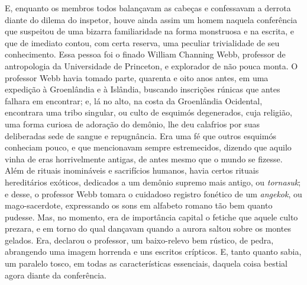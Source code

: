 E, enquanto os membros todos balançavam as cabeças e confessavam a
derrota diante do dilema do inspetor, houve ainda assim um homem naquela
conferência que suspeitou de uma bizarra familiaridade na forma
monstruosa e na escrita, e que de imediato contou, com certa reserva,
uma peculiar trivialidade de seu conhecimento. Essa pessoa foi o finado
William Channing Webb, professor de antropologia da Universidade de
Princeton, e explorador de não pouca monta. O professor Webb havia
tomado parte, quarenta e oito anos antes, em uma expedição à Groenlândia
e à Islândia, buscando inscrições rúnicas que antes falhara em
encontrar; e, lá no alto, na costa da Groenlândia Ocidental, encontrara
uma tribo singular, ou culto de esquimós degenerados, cuja religião, uma
forma curiosa de adoração do demônio, lhe deu calafrios por suas
deliberadas sede de sangue e repugnância. Era uma fé que outros esquimós
conheciam pouco, e que mencionavam sempre estremecidos, dizendo que
aquilo vinha de eras horrivelmente antigas, de antes mesmo que o mundo
se fizesse. Além de rituais inomináveis e sacrifícios humanos, havia
certos rituais hereditários exóticos, dedicados a um demônio supremo
mais antigo, ou \emph{tornasuk}; e desse, o professor Webb
tomara o cuidadoso registro fonético de um \emph{angekok}, ou
mago-sacerdote, expressando os sons em alfabeto romano tão bem quanto
pudesse. Mas, no momento, era de importância capital o fetiche que
aquele culto prezara, e em torno do qual dançavam quando a aurora saltou
sobre os montes gelados. Era, declarou o professor, um baixo-relevo bem
rústico, de pedra, abrangendo uma imagem horrenda e uns escritos
crípticos. E, tanto quanto sabia, um paralelo tosco, em todas as
características essenciais, daquela coisa bestial agora diante da
conferência.

